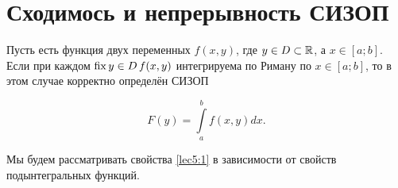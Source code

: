 \documentclass[../../main.tex]{subfiles}
\begin{document}
    \section{Сходимось и непрерывность СИЗОП}
    
    Пусть есть функция двух переменных $f(x,y)$, где $y \in D \subset \mathbb{R}$, 
    а $x \in [a;b]$. Если при каждом $\operatorname{fix} y \in D \, f(x, y)$ интегрируема 
    по Риману по $x \in [a;b]$, то в этом случае корректно определён СИЗОП
    
    \begin{equation} \label{lec5:1}
        F(y) = \int\limits_a^b f(x, y)dx.
    \end{equation}

    Мы будем рассматривать свойства \eqref{lec5:1} в зависимости от свойств 
    подынтегральных функций.
\end{document}
